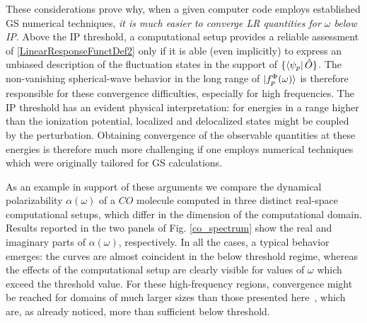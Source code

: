\documentclass[reprint,aps,prb]{revtex4-1}
\newcommand{\op}[1]{\hat {#1}}
\begin{document}
These considerations prove why, when a given computer code employs established GS numerical techniques,
\emph{it is much easier to converge LR quantities for $\omega$ below IP}.
Above the IP threshold, a computational setup
provides a reliable assessment of \eqref{LinearResponseFunctDef2} only if it is able (even implicitly) to express an
unbiased description of the fluctuation states in the support of $\{\bra{\psi_p}\op O\}$.
The non-vanishing spherical-wave behavior in the long range of $\ket{f_p^\Phi(\omega)}$ is therefore responsible
for these convergence difficulties, especially for high frequencies.
The IP threshold has an evident physical interpretation: for energies in a range higher than the ionization potential,
localized and delocalized states might be coupled by the perturbation. Obtaining convergence of the observable quantities at these energies is therefore much more challenging if one employs
numerical techniques which were originally tailored for GS calculations.

As an example in support of these arguments we compare the {dynamical polarizability $\alpha(\omega)$} of a $CO$ molecule computed in three distinct real-space computational setups, which differ in the dimension of the computational domain.
Results reported in the two panels of Fig. \ref{co_spectrum} show the real and imaginary parts of $\alpha(\omega)$, respectively. In all the cases, a typical behavior emerges: the curves are almost coincident in the below threshold regime,
whereas the effects of the computational setup are clearly visible for values of  $\omega$ which exceed the threshold value.
For these high-frequency regions, convergence might be reached for domains of much larger sizes than those presented here~\cite{baroni2008},
which are, as already noticed, more than sufficient below threshold.
\end{document}
